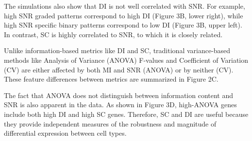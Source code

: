 The simulations also show that DI is not well correlated with SNR. For example, high SNR graded patterns correspond to high DI (Figure 3B, lower right), while high SNR specific binary patterns correspond to low DI (Figure 3B, upper left). In contrast, SC is highly correlated to SNR, to which it is closely related. 

Unlike information-based metrics like DI and SC, traditional variance-based methods like Analysis of Variance (ANOVA) F-values and Coefficient of Variation (CV) are either affected by both MI and SNR (ANOVA) or by neither (CV).  These feature differences between metrics are summarized in Figure 2C.

The fact that ANOVA does not distinguish between information content and SNR is also apparent in the data. As shown in Figure 3D, high-ANOVA genes include both high DI and high SC genes. Therefore, SC and DI are useful because they provide independent measures of the robustness and magnitude of differential expression between cell types.